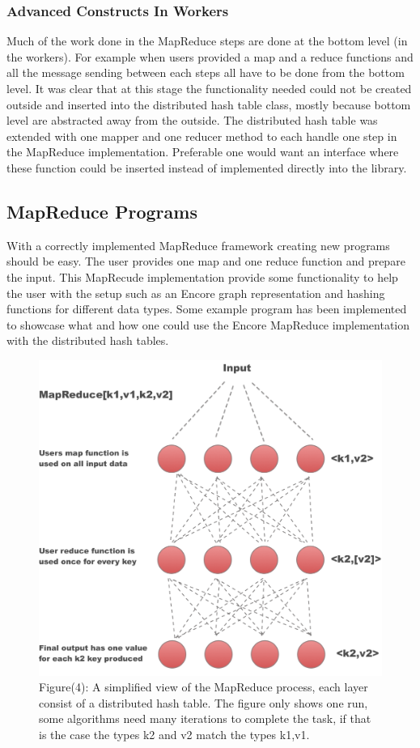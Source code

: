 \subsubsection{Advanced Constructs In Workers}
Much of the work done in the MapReduce steps are done at the bottom level (in the workers). For example when users provided a map and a reduce functions and all the message sending between each steps all have to be done from the bottom level. It was clear that at this stage the functionality needed could not be created outside and inserted into the distributed hash table class, mostly because bottom level are abstracted away from the outside. The distributed hash table was extended with one mapper and one reducer method to each handle one step in the MapReduce implementation. Preferable one would want an interface where these function could be inserted instead of implemented directly into the library.

\pagebreak

\subsection{MapReduce Programs}
With a correctly implemented MapReduce framework creating new programs should be easy. The user provides one map and one reduce function and prepare the input. This MapRecude implementation provide some functionality to help the user with the setup such as an Encore graph representation and hashing functions for different data types. Some example program has been implemented to showcase what and how one could use the Encore MapReduce implementation with the distributed hash tables.

\begin{figure}[h]
\includegraphics[width=12cm]{images/MapReduceFigure}
\\Figure(4): A simplified view of the MapReduce process, each layer consist of a distributed hash table. The figure only shows one run, some algorithms need many iterations to complete the task, if that is the case the types k2 and v2 match the types k1,v1.
\end{figure}
\pagebreak

